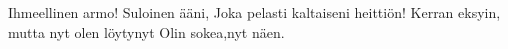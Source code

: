 Ihmeellinen armo!
Suloinen ääni,
Joka pelasti kaltaiseni heittiön!
Kerran eksyin,
mutta nyt olen löytynyt
Olin sokea,nyt näen. 
